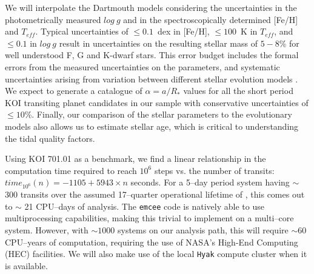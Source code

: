 We will interpolate the Dartmouth models considering the uncertainties
in the photometrically measured $log~g$ and in the spectroscopically
determined [Fe/H] and $T_{eff}$.  Typical uncertainties of $\le
0.1$~dex in [Fe/H], $\le 100$~K in $T_{eff}$, and $\le 0.1$ in $log~g$
result in uncertainties on the resulting stellar mass of $5-8$\% for
well understood F, G and K-dwarf stars.  This error budget includes
the formal errors from the measured uncertainties on the parameters,
and systematic uncertainties arising from variation between different
stellar evolution models
\citep[2-4\%;][]{Southworth2009}.  We expect to generate a
catalogue of $\alpha = a/R_*$ values for all the short period KOI
transiting planet candidates in our sample with conservative
uncertainties of $\le 10$\%.  Finally, our comparison of the stellar
parameters to the evolutionary models also allows us to estimate
stellar age, which is critical to understanding the tidal quality
factors.

\medskip
{\centerline{}}
\smallskip


Using KOI 701.01 as a benchmark, we find a linear relationship in the
computation time required to reach $10^6$ steps vs. the number of
transits: $time_{10^6}(n) = -1105 + 5943 \times n$ seconds.
%
For a 5--day period system having $\sim$ 300 transits over the assumed
17--quarter operational lifetime of \kepler, this comes out to $\sim$
21 CPU--days of analysis.  The {\tt emcee} code is natively able to
use multiprocessing capabilities, making this trivial to implement on
a multi--core system.  However, with $\sim 1000$ systems on our
analysis path, this will require $\sim 60$ CPU--years of computation,
requiring the use of NASA's High-End Computing (HEC) facilities.  We
will also make use of the local {\tt Hyak} compute cluster when it is
available.


